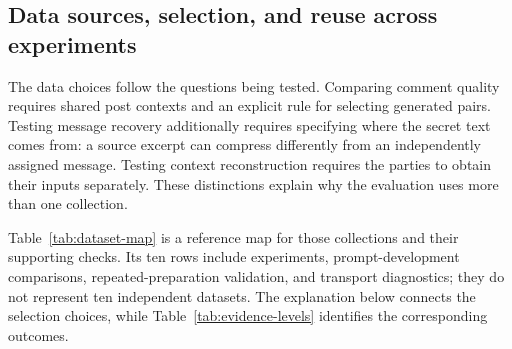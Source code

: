 \subsection{Data sources, selection, and reuse across experiments}
\label{sec:datasets}


The data choices follow the questions being tested. Comparing comment quality requires shared post contexts and an explicit rule for selecting generated pairs. Testing message recovery additionally requires specifying where the secret text comes from: a source excerpt can compress differently from an independently assigned message. Testing context reconstruction requires the parties to obtain their inputs separately. These distinctions explain why the evaluation uses more than one collection.

Table~\ref{tab:dataset-map} is a reference map for those collections and their supporting checks. Its ten rows include experiments, prompt-development comparisons, repeated-preparation validation, and transport diagnostics; they do not represent ten independent datasets. The explanation below connects the selection choices, while Table~\ref{tab:evidence-levels} identifies the corresponding outcomes.

